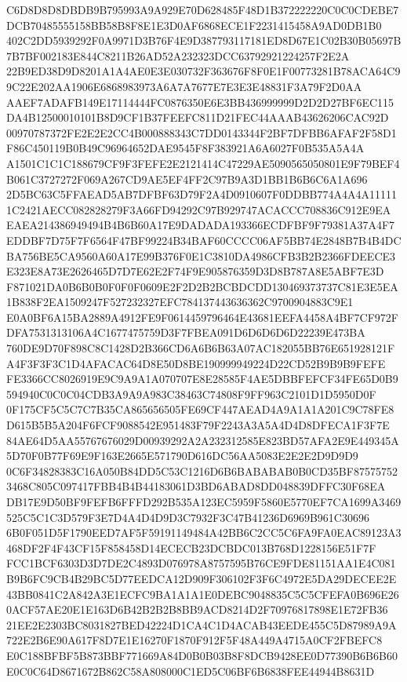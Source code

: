 \documentclass[UTF8,fontset=fandol,zihao=-4,a4paper]{ctexart}
\begin{document}
{{C6D8D8D8DBDB9B795993A9A929E70D628485F48D1B372222220C0C0CDEBE7DCB70485555158BB58B8F8E1E3D0AF6868ECE1F2231415458A9AD0DB1B0
402C2DD5939292F0A9971D3B76F4E9D387793117181ED8D67E1C02B30B05697B7B7BF002183E844C8211B26AD52A232323DCC63792921224257F2E2A
22B9ED38D9D8201A1A4AE0E3E030732F363676F8F0E1F00773281B78ACA64C99C22E202AA1906E6868983973A6A7A7677E7E3E3E48831F3A79F2D0AA
AAEF7ADAFB149E17114444FC0876350E6E3BB436999999D2D2D27BF6EC115DA4B12500010101B8D9CF1B37FEEFC811D21FEC44AAAB43626206CAC92D
00970787372FE2E2E2CC4B000888343C7DD0143344F2BF7DFBB6AFAF2F58D1F86C450119B0B49C96964652DAE9545F8F383921A6A6027F0B535A5A4A
A1501C1C1C188679CF9F3FEFE2E2121414C47229AE5090565050801E9F79BEF4B061C3727272F069A267CD9AE5EF4FF2C97B9A3D1BB1B6B6C6A1A696
2D5BC63C5FFAEAD5AB7DFBF63D79F2A4D0910607F0DDBB774A4A4A111111C2421AECC082828279F3A66FD94292C97B929747ACACCC708836C912E9EA
EAEA214386949494B4B6B60A17E9DADADA193366ECDFBF9F79381A37A4F7EDDBF7D75F7F6564F47BF99224B34BAF60CCCC06AF5BB74E2848B7B4B4DC
BA756BE5CA9560A60A17E99B376F0E1C3810DA4986CFB3B2B2366FDEECE3E323E8A73E2626465D7D7E62E2F74F9E905876359D3D8B787A8E5ABF7E3D
F871021DA0B6B0B0F0F0F0609E2F2D2B2BCBDCDD130469373737C81E3E5EA1B838F2EA1509247F527232327EFC784137443636362C9700904883C9E1
E0A0BF6A15BA2889A4912FE9F0614459796464E43681EEFA4458A4BF7CF972FDFA7531313106A4C1677475759D3F7FBEA091D6D6D6D6D22239E473BA
760DE9D70F898C8C1428D2B366CD6A6B6B63A07AC182055BB76E651928121FA4F3F3F3C1D4AFACAC64D8E50D8BE190999949224D22CD52B9B9B9FEFE
FE3366CC8026919E9C9A9A1A070707E8E28585F4AE5DBBFEFCF34FE65D0B9594940C0C0C04CDB3A9A9A983C38463C74808F9FF963C2101D1D5950D0F
0F175CF5C5C7C7B35CA865656505FE69CF447AEAD4A9A1A1A201C9C78FE8D615B5B5A204F6FCF9088542E951483F79F2243A3A5A4D4D8DFECA1F3F7E
84AE64D5AA55767676029D00939292A2A232312585E823BD57AFA2E9E449345A5D70F0B77F69E9F163E2665E571790D616DC56AA5083E2E2E2D9D9D9
0C6F34828383C16A050B84DD5C53C1216D6B6BABABAB0B0CD35BF875757523468C805C097417FBB4B4B44183061D3BD6ABAD8DD048839DFFC30F68EA
DB17E9D50BF9FEFB6FFFD292B535A123EC5959F5860E5770EF7CA1699A3469525C5C1C3D579F3E7D4A4D4D9D3C7932F3C47B41236D6969B961C30696
6B0F051D5F1790EED7AF5F59191149484A42BB6C2CC5C6FA9FA0EAC89123A3468DF2F4F43CF15F858458D14ECECB23DCBDC013B768D1228156E51F7F
FCC1BCF6303D3D7DE2C4893D076978A8757595B76CE9FDE81151AA1E4C081B9B6FC9CB4B29BC5D77EEDCA12D909F306102F3F6C4972E5DA29DECEE2E
43BB0841C2A842A3E1ECFC9BA1A1A1E0DEBC9048835C5C5CFEFA0B696E260ACF57AE20E1E163D6B42B2B2B8BB9ACD8214D2F70976817898E1E72FB36
21EE2E2303BC8031827BED42224D1CA4C1D4ACAB43EEDE455C5D87989A9A722E2B6E90A617F8D7E1E16270F1870F912F5F48A449A4715A0CF2FBEFC8
E0C188BFBF5B873BBF771669A84D0B0B03B8F8DCB9428EE0D77390B6B6B60E0C0C64D8671672B862C58A808000C1ED5C06BF6B6838FEE44944B8631D
}}
\end{document}
